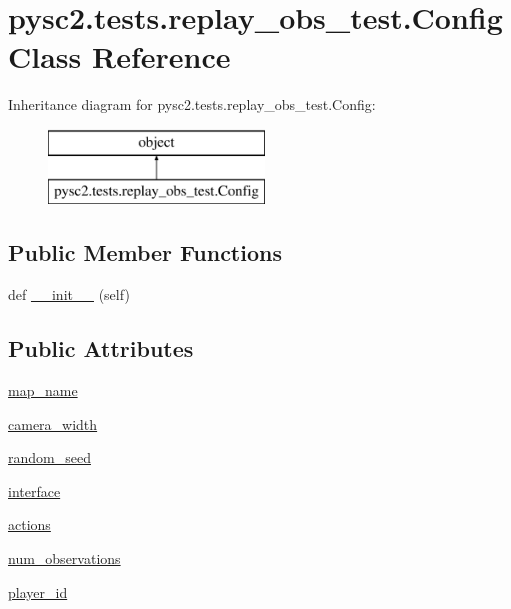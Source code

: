 \hypertarget{classpysc2_1_1tests_1_1replay__obs__test_1_1_config}{}\section{pysc2.\+tests.\+replay\+\_\+obs\+\_\+test.\+Config Class Reference}
\label{classpysc2_1_1tests_1_1replay__obs__test_1_1_config}
Inheritance diagram for pysc2.\+tests.\+replay\+\_\+obs\+\_\+test.\+Config\+:\begin{figure}[H]
\begin{center}
\leavevmode
\includegraphics[height=2.000000cm]{classpysc2_1_1tests_1_1replay__obs__test_1_1_config}
\end{center}
\end{figure}
\subsection*{Public Member Functions}
\begin{DoxyCompactItemize}
\item 
def \mbox{\hyperlink{classpysc2_1_1tests_1_1replay__obs__test_1_1_config_a93f88965c69c40958a8953bb0d1ff86f}{\+\_\+\+\_\+init\+\_\+\+\_\+}} (self)
\end{DoxyCompactItemize}
\subsection*{Public Attributes}
\begin{DoxyCompactItemize}
\item 
\mbox{\hyperlink{classpysc2_1_1tests_1_1replay__obs__test_1_1_config_a718f77f4c6ea365e1bca95a4223ce0bf}{map\+\_\+name}}
\item 
\mbox{\hyperlink{classpysc2_1_1tests_1_1replay__obs__test_1_1_config_a651e8aa31086c011dd0a7330346affe1}{camera\+\_\+width}}
\item 
\mbox{\hyperlink{classpysc2_1_1tests_1_1replay__obs__test_1_1_config_aaf049ddbfd4a171cf08ef217a981451a}{random\+\_\+seed}}
\item 
\mbox{\hyperlink{classpysc2_1_1tests_1_1replay__obs__test_1_1_config_ab14251df14bce385ecb13b6676e3fa1e}{interface}}
\item 
\mbox{\hyperlink{classpysc2_1_1tests_1_1replay__obs__test_1_1_config_a688afdf1bec9d559e11298cb1a16a6d4}{actions}}
\item 
\mbox{\hyperlink{classpysc2_1_1tests_1_1replay__obs__test_1_1_config_a138bf9778d63f8e2211c21f93b968229}{num\+\_\+observations}}
\item 
\mbox{\hyperlink{classpysc2_1_1tests_1_1replay__obs__test_1_1_config_ad37c2e73d565130c37c8a0e2e065029b}{player\+\_\+id}}
\end{DoxyCompactItemize}


